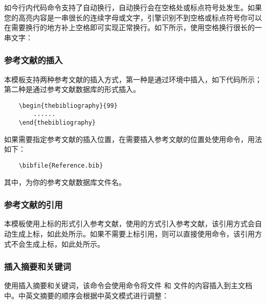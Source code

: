 \documentclass{nitthesis}
\begin{document}
如今行内代码命令支持了自动换行，自动换行会在空格处或标点符号处发生。如果您的高亮内容是一串很长的连续字母或文字，\LaTeXe{}引擎识别不到空格或标点符号你可以在需要换行的地方补上空格即可实现正常换行。如下所示，使用空格换行很长的一串文字：

\subsubsection{参考文献的插入}

本模板支持两种参考文献的插入方式，第一种是通过环境中插入，如下代码所示；第二种是通过参考文献数据库的形式插入。

\begin{lstlisting}
    \begin{thebibliography}{99}
        ......
    \end{thebibliography}
\end{lstlisting}

如果需要指定参考文献的插入位置，在需要插入参考文献的位置处使用命令，用法如下：

\begin{lstlisting}
    \bibfile{Reference.bib}
\end{lstlisting}

其中，为你的参考文献数据库文件名。

\subsubsection{参考文献的引用}

本模板使用上标的形式引入参考文献，使用的方式引入参考文献，该引用方式会自动生成上标，如此处所示。如果不需要上标引用，则可以直接使用命令，该引用方式不会生成上标，如此处\cite{全权2020低空无人机交通管理概览与建议}所示。

\subsubsection{插入摘要和关键词}

使用插入摘要和关键词，该命令会使用命令将文件  和  文件的内容插入到主文档中。中英文摘要的顺序会根据中英文模式进行调整：
\end{document}
